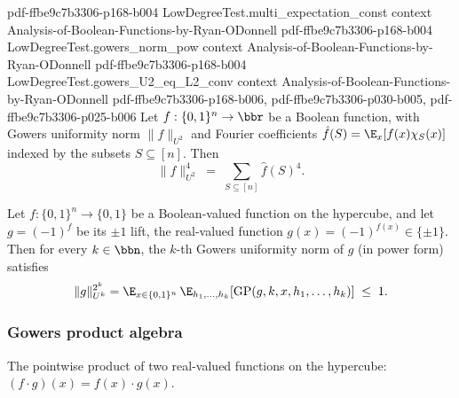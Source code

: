 \begin{lemma}
  {pdf-ffbe9c7b3306-p168-b004}
\proofstep
  {LowDegreeTest.multi_expectation_const}
  {context}
  {Analysis-of-Boolean-Functions-by-Ryan-ODonnell}
  {pdf-ffbe9c7b3306-p168-b004}
\proofstep
  {LowDegreeTest.gowers_norm_pow}
  {context}
  {Analysis-of-Boolean-Functions-by-Ryan-ODonnell}
  {pdf-ffbe9c7b3306-p168-b004}
\proofstep
  {LowDegreeTest.gowers_U2_eq_L2_conv}
  {context}
  {Analysis-of-Boolean-Functions-by-Ryan-ODonnell}
  {pdf-ffbe9c7b3306-p168-b006,
    pdf-ffbe9c7b3306-p030-b005,
    pdf-ffbe9c7b3306-p025-b006}
Let $f : \{0,1\}^n \to \bbr$ be a Boolean function, with Gowers uniformity norm
$\|f\|_{U^2}$ and Fourier coefficients $\hat f(S) = \E_x[f(x)\chi_S(x)]$ indexed by the
subsets $S \subseteq [n]$. Then
\[
  \|f\|_{U^2}^4 \;=\; \sum_{S \subseteq [n]} \hat f(S)^4 .
\]
\end{lemma}

\begin{lemma}
\label{LowDegreeTest.gowers_norm_le_one}
\leanok
{}
Let $f : \{0,1\}^n \to \{0,1\}$ be a Boolean-valued function on the hypercube, and let
$g = (-1)^f$ be its $\pm 1$ lift, the real-valued function $g(x) = (-1)^{f(x)} \in \{\pm
1\}$. Then for every $k \in \bbn$, the $k$-th Gowers uniformity norm of $g$ (in power
form) satisfies
\[
  \|g\|_{U^k}^{2^k}
= \E_{x \in \{0,1\}^n}\,\E_{h_1,\ldots,h_k}\!\left[\mathrm{GP}(g, k, x,
h_1,\ldots,h_k)\right]
  \;\le\; 1.
\]
\end{lemma}

\subsubsection{Gowers product algebra}

\begin{definition}
\label{LowDegreeTest.boolFun_mul}
\leanok
{}
The pointwise product of two real-valued functions on the hypercube:
$(f \cdot g)(x) = f(x) \cdot g(x)$.
\end{definition}

